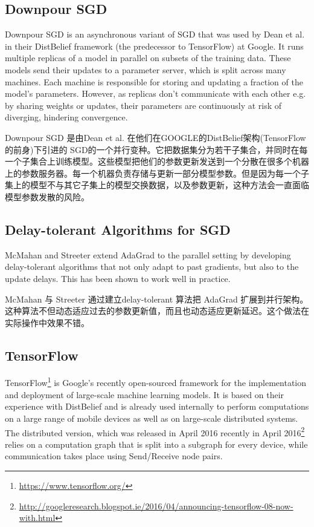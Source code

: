 \documentclass{article}
\begin{document}
\subsection{Downpour SGD}

Downpour SGD is an asynchronous variant of SGD that was used by Dean et al. \cite{Dean2012} in their DistBelief framework (the predecessor to TensorFlow) at Google. It runs multiple replicas of a model in parallel on subsets of the training data. These models send their updates to a parameter server, which is split across many machines. Each machine is responsible for storing and updating a fraction of the model's parameters. However, as replicas don't communicate with each other e.g. by sharing weights or updates, their parameters are continuously at risk of diverging, hindering convergence.

Downpour SGD 是由Dean et al. \cite{Dean2012}在他们在GOOGLE的DistBelief架构(TensorFlow 的前身)下引进的 SGD的一个并行变种。它把数据集分为若干子集合，并同时在每一个子集合上训练模型。这些模型把他们的参数更新发送到一个分散在很多个机器上的参数服务器。每一个机器负责存储与更新一部分模型参数。但是因为每一个子集上的模型不与其它子集上的模型交换数据，以及参数更新，这种方法会一直面临模型参数发散的风险。

\subsection{Delay-tolerant Algorithms for SGD}

McMahan and Streeter \cite{Mcmahan2014} extend AdaGrad to the parallel setting by developing delay-tolerant algorithms that not only adapt to past gradients, but also to the update delays. This has been shown to work well in practice.

McMahan 与 Streeter \cite{Mcmahan2014} 通过建立delay-tolerant 算法把 AdaGrad 扩展到并行架构。这种算法不但动态适应过去的参数更新值，而且也动态适应更新延迟。这个做法在实际操作中效果不错。

\subsection{TensorFlow}

TensorFlow\footnote{\url{https://www.tensorflow.org/}} \cite{Abadi2015a} is Google's recently open-sourced framework for the implementation and deployment of large-scale machine learning models. It is based on their experience with DistBelief and is already used internally to perform computations on a large range of mobile devices as well as on large-scale distributed systems. The distributed version, which was released in April 2016 recently in April 2016\footnote{\url{http://googleresearch.blogspot.ie/2016/04/announcing-tensorflow-08-now-with.html}} relies on a computation graph that is split into a subgraph for every device, while communication takes place using Send/Receive node pairs.
\end{document}
